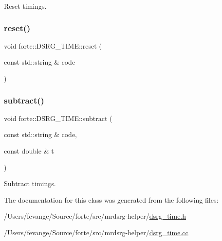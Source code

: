 Reset timings. 

\mbox{\label{classforte_1_1_d_s_r_g___t_i_m_e_a070c7ab301e9a3e3f4fca2c4e0321981}} 
\subsubsection{\texorpdfstring{reset()}{reset()}\hspace{0.1cm}{\footnotesize\ttfamily [2/2]}}
{\footnotesize\ttfamily void forte\+::\+D\+S\+R\+G\+\_\+\+T\+I\+M\+E\+::reset (\begin{DoxyParamCaption}\item[{const std\+::string \&}]{code }\end{DoxyParamCaption})}

\mbox{\label{classforte_1_1_d_s_r_g___t_i_m_e_ae39cb2b7b5e9854bc10a174f2733d744}} 
\subsubsection{\texorpdfstring{subtract()}{subtract()}}
{\footnotesize\ttfamily void forte\+::\+D\+S\+R\+G\+\_\+\+T\+I\+M\+E\+::subtract (\begin{DoxyParamCaption}\item[{const std\+::string \&}]{code,  }\item[{const double \&}]{t }\end{DoxyParamCaption})}



Subtract timings. 



The documentation for this class was generated from the following files\+:\begin{DoxyCompactItemize}
\item 
/\+Users/fevange/\+Source/forte/src/mrdsrg-\/helper/\mbox{\hyperlink{dsrg__time_8h}{dsrg\+\_\+time.\+h}}\item 
/\+Users/fevange/\+Source/forte/src/mrdsrg-\/helper/\mbox{\hyperlink{dsrg__time_8cc}{dsrg\+\_\+time.\+cc}}\end{DoxyCompactItemize}
